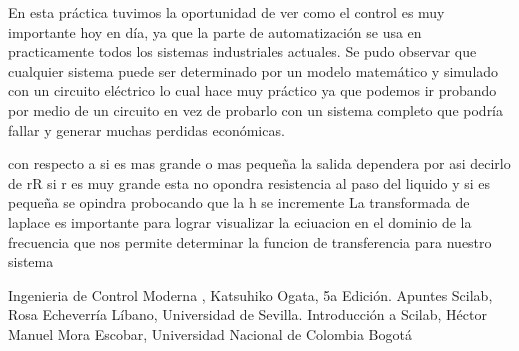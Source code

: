 \documentclass[12pt,a4paper]{IEEEtran}
\begin{document}
En esta práctica tuvimos la oportunidad de ver como el control es muy importante hoy en día, ya que la parte de automatización se usa en practicamente todos los sistemas industriales actuales. Se pudo observar que cualquier sistema puede ser determinado por un modelo matemático y simulado con un circuito eléctrico lo cual hace muy práctico ya que podemos ir probando por medio de un circuito en vez de probarlo con un sistema completo que podría fallar y generar muchas perdidas económicas.

con respecto a si es mas grande o mas pequeña la salida dependera por asi decirlo de rR si r es muy grande esta no opondra resistencia al paso del liquido y si es pequeña se opindra probocando que la h se incremente 
La transformada de laplace es importante para lograr visualizar la eciuacion en el dominio de la frecuencia que nos permite determinar la funcion de transferencia para nuestro sistema















 
 




 










\begin{thebibliography}{99}
	 Ingenieria de Control Moderna , Katsuhiko Ogata, 5a Edición.
	 Apuntes Scilab, Rosa Echeverría Líbano, Universidad de Sevilla.
	 Introducción a Scilab, Héctor Manuel Mora Escobar, Universidad Nacional de Colombia Bogotá
\end{thebibliography}
\end{document}
